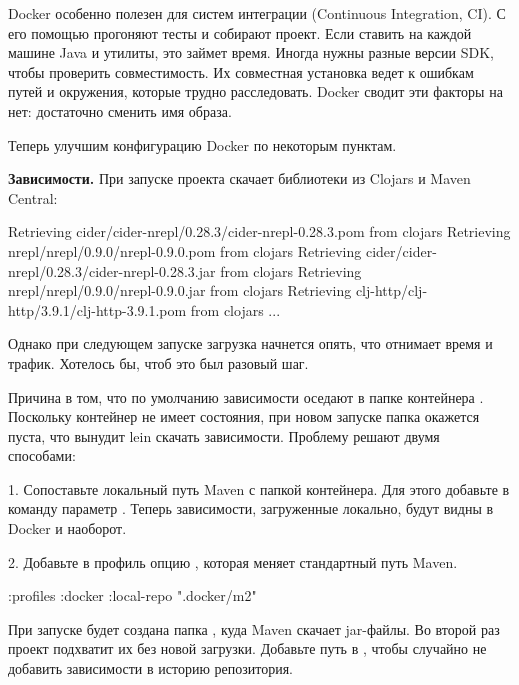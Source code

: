 Docker особенно полезен для систем интеграции (Continuous Integration, CI). С его помощью прогоняют тесты и собирают проект. Если ставить на каждой машине Java и утилиты, это займет время. Иногда нужны разные версии SDK, чтобы проверить совместимость. Их совместная установка ведет к ошибкам путей и окружения, которые трудно расследовать. Docker сводит эти факторы на нет: достаточно сменить имя образа.

Теперь улучшим конфигурацию Docker по некоторым пунктам.

\textbf{Зависимости.} При запуске проекта  скачает библиотеки из Clojars и Maven Central:

\begin{english}
  \begin{text}
Retrieving cider/cider-nrepl/0.28.3/cider-nrepl-0.28.3.pom from clojars
Retrieving nrepl/nrepl/0.9.0/nrepl-0.9.0.pom from clojars
Retrieving cider/cider-nrepl/0.28.3/cider-nrepl-0.28.3.jar from clojars
Retrieving nrepl/nrepl/0.9.0/nrepl-0.9.0.jar from clojars
Retrieving clj-http/clj-http/3.9.1/clj-http-3.9.1.pom from clojars
...
  \end{text}
\end{english}

Однако при следующем запуске загрузка начнется опять, что отнимает время и трафик. Хотелось бы, чтоб это был разовый шаг.

Причина в том, что по умолчанию зависимости оседают в папке контейнера . Поскольку контейнер не имеет состояния, при новом запуске папка окажется пуста, что вынудит lein скачать зависимости. Проблему решают двумя способами:

1. Сопоставьте локальный путь Maven с папкой контейнера. Для этого добавьте в команду  параметр . Теперь зависимости, загруженные локально, будут видны в Docker и наоборот.

2. Добавьте в профиль  опцию , которая меняет стандартный путь Maven.

\begin{english}
  \begin{clojure}
{:profiles
 {:docker {:local-repo ".docker/m2"}}}
  \end{clojure}
\end{english}

При запуске  будет создана папка , куда Maven скачает jar-файлы. Во второй раз проект подхватит их без новой загрузки. Добавьте путь  в , чтобы случайно не добавить зависимости в историю репозитория.


